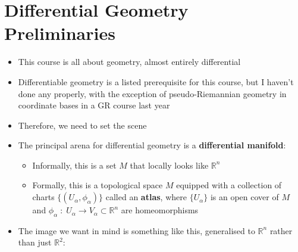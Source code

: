 \documentclass[12pt,a4paper]{article}
\numberwithin{equation}{section}
\begin{document}
	\section{Differential Geometry Preliminaries}
	\begin{itemize}
		\item This course is all about geometry, almost entirely differential
		\item Differentiable geometry is a listed prerequisite for this course, but I haven't done any properly, with the exception of pseudo-Riemannian geometry in coordinate bases in a GR course last year
		\item Therefore, we need to set the scene
		\item The principal arena for differential geometry is a \textbf{differential manifold}:
		\begin{itemize}
			\item Informally, this is a set $M$ that locally looks like $\mathbb{R}^{n}$
			\item Formally, this is a topological space $M$ equipped with a collection of charts $\{(U_{\alpha},\phi_{\alpha})\}$ called an \textbf{atlas}, where $\{U_{\alpha}\}$ is an open cover of $M$ and $\phi_{\alpha}\;:\;U_{\alpha}\to V_{\alpha}\subset\mathbb{R}^{n}$ are homeomorphisms
		\end{itemize}
		\item The image we want in mind is something like this, generalised to $\mathbb{R}^{n}$ rather than just $\mathbb{R}^{2}$:
		\begin{figure}[H]
			\centering
\end{figure}
\end{itemize}
\end{document}

